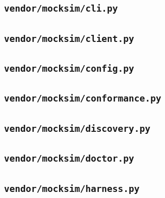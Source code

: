 \subsection*{\texttt{vendor/mocksim/cli.py}}

\subsection*{\texttt{vendor/mocksim/client.py}}

\subsection*{\texttt{vendor/mocksim/config.py}}

\subsection*{\texttt{vendor/mocksim/conformance.py}}

\subsection*{\texttt{vendor/mocksim/discovery.py}}

\subsection*{\texttt{vendor/mocksim/doctor.py}}

\subsection*{\texttt{vendor/mocksim/harness.py}}

